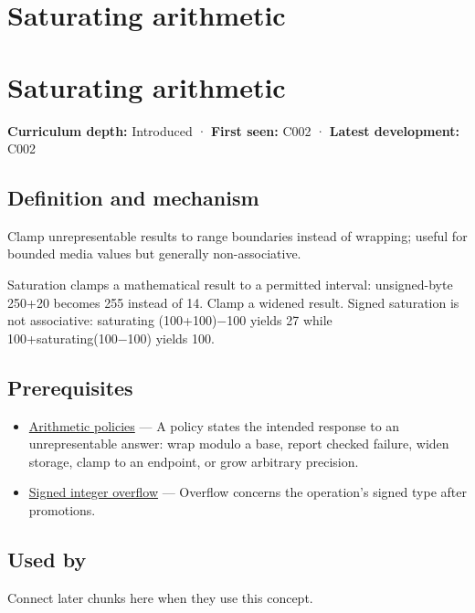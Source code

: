 \hypertarget{appendix-3999c6209649}{}
\section*{Saturating arithmetic}
\section{Saturating arithmetic}\label{appendix-3999c6209649-saturating-arithmetic}

\textbf{Curriculum depth:} Introduced · \textbf{First seen:} C002 · \textbf{Latest development:} C002

\subsection{Definition and mechanism}\label{appendix-3999c6209649-definition-and-mechanism}

Clamp unrepresentable results to range boundaries instead of wrapping; useful for bounded media values but generally non-associative.

Saturation clamps a mathematical result to a permitted interval: unsigned-byte 250+20 becomes 255 instead of 14. Clamp a widened result. Signed saturation is not associative: saturating (100+100)−100 yields 27 while 100+saturating(100−100) yields 100.

\subsection{Prerequisites}\label{appendix-3999c6209649-prerequisites}

\begin{itemize}
\tightlist
\item
  \hyperref[appendix-2ed044358b82]{Arithmetic policies} --- A policy states the intended response to an unrepresentable answer: wrap modulo a base, report checked failure, widen storage, clamp to an endpoint, or grow arbitrary precision.
\item
  \hyperref[appendix-1a599c924a4e]{Signed integer overflow} --- Overflow concerns the operation's signed type after promotions.
\end{itemize}

\subsection{Used by}\label{appendix-3999c6209649-used-by}

Connect later chunks here when they use this concept.

